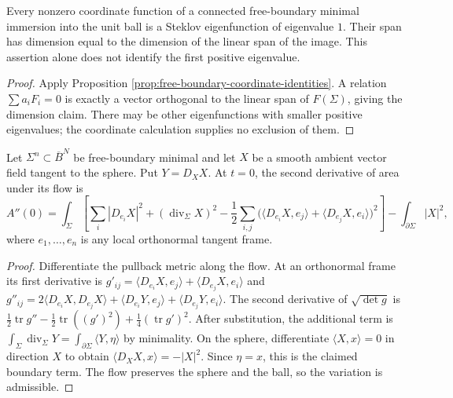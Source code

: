 \begin{corollary}\label{cor:free-boundary-steklov-one}
Every nonzero coordinate function of a connected free-boundary minimal immersion into the unit ball is a Steklov eigenfunction of eigenvalue $1$. Their span has dimension equal to the dimension of the linear span of the image. This assertion alone does not identify the first positive eigenvalue.
\end{corollary}
\begin{proof}
Apply Proposition \ref{prop:free-boundary-coordinate-identities}. A relation $\sum a_iF_i=0$ is exactly a vector orthogonal to the linear span of $F(\Sigma)$, giving the dimension claim. There may be other eigenfunctions with smaller positive eigenvalues; the coordinate calculation supplies no exclusion of them.
\end{proof}

\begin{lemma}\label{lem:free-boundary-flow-acceleration}
Let $\Sigma^n\subset\overline B^N$ be free-boundary minimal and let $X$ be a smooth ambient vector field tangent to the sphere. Put $Y=D_XX$. At $t=0$, the second derivative of area under its flow is
\[
 A''(0)=\int_\Sigma\left[\sum_i|D_{e_i}X|^2+(\operatorname{div}_\Sigma X)^2
 -\frac12\sum_{i,j}\bigl(\langle D_{e_i}X,e_j\rangle+\langle D_{e_j}X,e_i\rangle\bigr)^2\right]
 -\int_{\partial\Sigma}|X|^2,
\]
where $e_1,\ldots,e_n$ is any local orthonormal tangent frame.
\end{lemma}
\begin{proof}
Differentiate the pullback metric along the flow. At an orthonormal frame its first derivative is
$g'_{ij}=\langle D_{e_i}X,e_j\rangle+\langle D_{e_j}X,e_i\rangle$ and
$g''_{ij}=2\langle D_{e_i}X,D_{e_j}X\rangle+\langle D_{e_i}Y,e_j\rangle+\langle D_{e_j}Y,e_i\rangle$.
The second derivative of $\sqrt{\det g}$ is
$\tfrac12\operatorname{tr}g''-\tfrac12\operatorname{tr}((g')^2)+\tfrac14(\operatorname{tr}g')^2$.
After substitution, the additional term is $\int_\Sigma\operatorname{div}_\Sigma Y=\int_{\partial\Sigma}\langle Y,\eta\rangle$ by minimality. On the sphere, differentiate $\langle X,x\rangle=0$ in direction $X$ to obtain $\langle D_XX,x\rangle=-|X|^2$. Since $\eta=x$, this is the claimed boundary term. The flow preserves the sphere and the ball, so the variation is admissible.
\end{proof}

